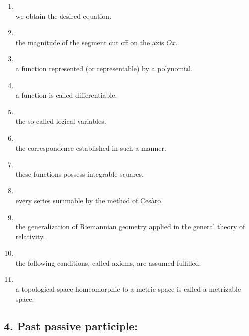 \begin{enumerate}[label=3.\arabic*)]
\item {}\\
      we obtain the desired equation.
\item {}\\
      the magnitude of the segment cut off on the axis $Ox$.
\item {}\\
      a function represented (or representable) by a polynomial.
\item {}\\
      a function is called differentiable.
\item {}\\
      the so-called logical variables.
\item {}\\
      the correspondence established in such a manner.
\item {}\\
      these functions possess integrable squares.
\item {}\\
      every series summable by the method of Cesàro.
\item {}\\
      the generalization of Riemannian geometry applied in the general theory of relativity.
\item {}\\
      the following conditions, called axioms, are assumed fulfilled.
\item {}\\
      a topological space homeomorphic to a metric space is called a metrizable space.
\end{enumerate}

\subsection*{4. Past passive participle: }

